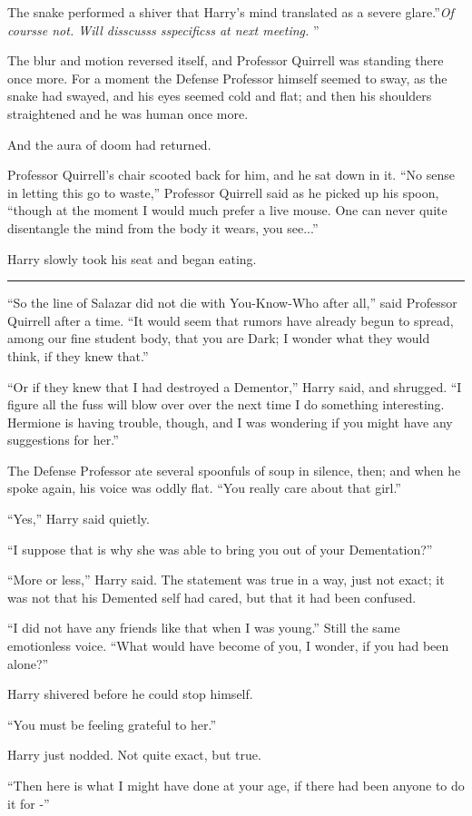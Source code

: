The snake performed a shiver that Harry's mind translated as a severe
glare.''\emph{Of coursse not. Will disscusss sspecificss at next
meeting.} ''

The blur and motion reversed itself, and Professor Quirrell was standing
there once more. For a moment the Defense Professor himself seemed to
sway, as the snake had swayed, and his eyes seemed cold and flat; and
then his shoulders straightened and he was human once more.

And the aura of doom had returned.

Professor Quirrell's chair scooted back for him, and he sat down in it.
``No sense in letting this go to waste,'' Professor Quirrell said as he
picked up his spoon, ``though at the moment I would much prefer a live
mouse. One can never quite disentangle the mind from the body it wears,
you see...''

Harry slowly took his seat and began eating.

\begin{center}\rule{3in}{0.4pt}\end{center}

``So the line of Salazar did not die with You-Know-Who after all,'' said
Professor Quirrell after a time. ``It would seem that rumors have
already begun to spread, among our fine student body, that you are Dark;
I wonder what they would think, if they knew that.''

``Or if they knew that I had destroyed a Dementor,'' Harry said, and
shrugged. ``I figure all the fuss will blow over over the next time I do
something interesting. Hermione is having trouble, though, and I was
wondering if you might have any suggestions for her.''

The Defense Professor ate several spoonfuls of soup in silence, then;
and when he spoke again, his voice was oddly flat. ``You really care
about that girl.''

``Yes,'' Harry said quietly.

``I suppose that is why she was able to bring you out of your
Dementation?''

``More or less,'' Harry said. The statement was true in a way, just not
exact; it was not that his Demented self had cared, but that it had been
confused.

``I did not have any friends like that when I was young.'' Still the
same emotionless voice. ``What would have become of you, I wonder, if
you had been alone?''

Harry shivered before he could stop himself.

``You must be feeling grateful to her.''

Harry just nodded. Not quite exact, but true.

``Then here is what I might have done at your age, if there had been
anyone to do it for -''
